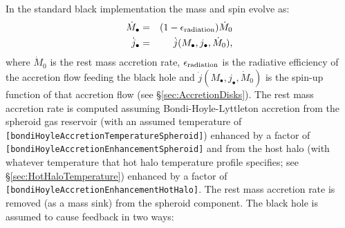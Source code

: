 In the standard black implementation the mass and spin evolve as:
\begin{eqnarray}
\dot{M}_\bullet &=& (1-\epsilon_{\rm radiation}) \dot{M}_0 \\
\dot{j}_\bullet &=& \dot{j}(M_\bullet,j_\bullet,\dot{M}_0),
\end{eqnarray}
where $\dot{M}_0$ is the rest mass accretion rate, $\epsilon_{\rm radiation}$ is the radiative efficiency of the accretion flow feeding the black hole and $\dot{j}(M_\bullet,j_\bullet,\dot{M}_0)$ is the spin-up function of that accretion flow (see \S\ref{sec:AccretionDisks}). The rest mass accretion rate is computed assuming Bondi-Hoyle-Lyttleton accretion from the spheroid gas reservoir (with an assumed temperature of {\tt [bondiHoyleAccretionTemperatureSpheroid]}) enhanced by a factor of {\tt [bondiHoyleAccretionEnhancementSpheroid]} and from the host halo (with whatever temperature that hot halo temperature profile specifies; see \S\ref{sec:HotHaloTemperature}) enhanced by a factor of {\tt [bondiHoyleAccretionEnhancementHotHalo]}. The rest mass accretion rate is removed (as a mass sink) from the spheroid component. The black hole is assumed to cause feedback in two ways:
